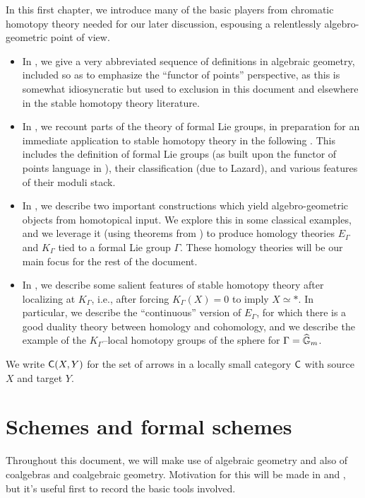 In this first chapter, we introduce many of the basic players from chromatic homotopy theory needed for our later discussion, espousing a relentlessly algebro-geometric point of view.
\begin{itemize}
\item In , we give a very abbreviated sequence of definitions in algebraic geometry, included so as to emphasize the ``functor of points'' perspective, as this is somewhat idiosyncratic but used to exclusion in this document and elsewhere in the stable homotopy theory literature.
\item In , we recount parts of the theory of formal Lie groups, in preparation for an immediate application to stable homotopy theory in the following .  This includes the definition of formal Lie groups (as built upon the functor of points language in ), their classification (due to Lazard), and various features of their moduli stack.
\item In , we describe two important constructions which yield algebro-geometric objects from homotopical input.  We explore this in some classical examples, and we leverage it (using theorems from ) to produce homology theories $E_\Gamma$ and $K_\Gamma$ tied to a formal Lie group $\Gamma$.  These homology theories will be our main focus for the rest of the document.
\item In , we describe some salient features of stable homotopy theory after localizing at $K_\Gamma$, i.e., after forcing $K_\Gamma(X) = 0$ to imply $X \simeq *$.  In particular, we describe the ``continuous'' version of $E_\Gamma$, for which there is a good duality theory between homology and cohomology, and we describe the example of the $K_\Gamma$--local homotopy groups of the sphere for $\Gamma = \widehat{\mathbb G}_m$.
\end{itemize}

\noindent We write $\mathsf{C}(X, Y)$ for the set of arrows in a locally small category $\mathsf{C}$ with source $X$ and target $Y$.

\section*{Schemes and formal schemes}\label{SchemesAndFormalSchemes}

Throughout this document, we will make use of algebraic geometry and also of coalgebras and coalgebraic geometry.  Motivation for this will be made in  and , but it's useful first to record the basic tools involved.

